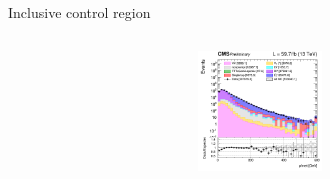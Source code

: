 \documentclass[8pt]{beamer}
\begin{document}
\begin{frame}{Inclusive control region}
\begin{columns}
\begin{column}{0.33\textwidth}
			\begin{center}
     			\includegraphics[width=1.0\textwidth, height=90pt]{figs/2018/log_cratio_inclusiveCR_ee_METcorrected_pt.png}
    		\end{center}		
		\end{column}
\end{columns} \vfill
\end{frame}
\end{document}
